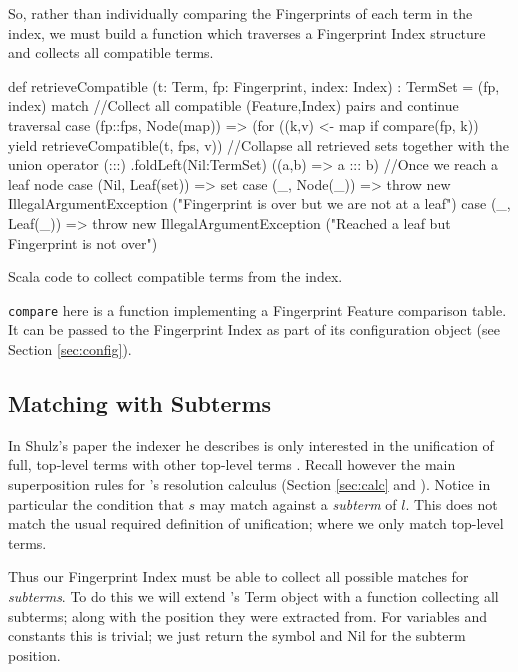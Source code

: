 So, rather than individually comparing the Fingerprints of each term in the
index, we must build a function which traverses a Fingerprint Index structure
and collects all compatible terms.

\begin{listing}[H]
\begin{scalacode}
def retrieveCompatible
  (t: Term, fp: Fingerprint, index: Index) : TermSet =
  (fp, index) match {
//Collect all compatible (Feature,Index) pairs and continue traversal
    case (fp::fps, Node(map)) => (for ((k,v) <- map if compare(fp, k))
        yield retrieveCompatible(t, fps, v))
//Collapse all retrieved sets together with the union operator (:::)
      .foldLeft(Nil:TermSet) ((a,b) => a ::: b)
//Once we reach a leaf node 
    case (Nil, Leaf(set)) => set
    case (_, Node(_)) => throw new IllegalArgumentException
         ("Fingerprint is over but we are not at a leaf")
    case (_, Leaf(_)) => throw new IllegalArgumentException
         ("Reached a leaf but Fingerprint is not over")
  }
\end{scalacode}
\caption{Scala code to collect compatible terms from the index.}
\label{lst:retrieve}
\end{listing}

\verb!compare! here is a function implementing a Fingerprint Feature comparison
table. It can be passed to the Fingerprint Index as part of its configuration
object (see Section \ref{sec:config}).

\subsection{Matching with Subterms}

In Shulz's paper the indexer he describes is only interested in
the unification of full, top-level terms with other top-level terms \cite{shulz12}.
Recall however the main superposition rules for \beagle's resolution calculus (Section \ref{sec:calc} and \cite{baum13}).
Notice in particular the condition that $s$ may match against a \emph{subterm}
of $l$. This does not match the usual required definition of unification; where
we only match top-level terms.

Thus our Fingerprint Index must be able to collect all possible matches for \emph{subterms}.
To do this we will extend \beagle's Term object with a function collecting all
subterms; along with the position they were extracted from. For variables and constants
this is trivial; we just return the symbol and Nil for the subterm position.

